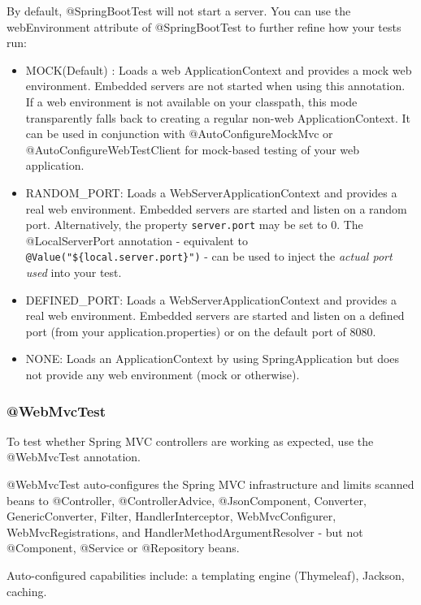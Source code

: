 \documentclass{scrartcl}
\begin{document}
By default, @SpringBootTest will not start a server. You can use the webEnvironment attribute of @SpringBootTest to further refine how your tests run:

\begin{itemize}
    \item MOCK(Default) : Loads a web ApplicationContext and provides a mock web environment. Embedded servers are not started when using this annotation. If a web environment is not available on your classpath, this mode transparently falls back to creating a regular non-web ApplicationContext. It can be used in conjunction with @AutoConfigureMockMvc or @AutoConfigureWebTestClient for mock-based testing of your web application.

    \item RANDOM\_PORT: Loads a WebServerApplicationContext and provides a real web environment. Embedded servers are started and listen on a random port.
    Alternatively, the property \lstinline|server.port| may be set to 0.
    The @LocalServerPort annotation - equivalent to  \lstinline|@Value("${local.server.port}")| - can be used to inject the \textit{actual port used} into your test.

    \item DEFINED\_PORT: Loads a WebServerApplicationContext and provides a real web environment. Embedded servers are started and listen on a defined port (from your application.properties) or on the default port of 8080.

    \item NONE: Loads an ApplicationContext by using SpringApplication but does not provide any web environment (mock or otherwise).
\end{itemize}

\subsubsection{@WebMvcTest}

To test whether Spring MVC controllers are working as expected, use the @WebMvcTest annotation.

@WebMvcTest auto-configures the Spring MVC infrastructure and limits scanned beans to @Controller, @ControllerAdvice, @JsonComponent, Converter, GenericConverter, Filter, HandlerInterceptor, WebMvcConfigurer, WebMvcRegistrations, and HandlerMethodArgumentResolver - but not @Component, @Service or @Repository beans.

Auto-configured capabilities include: a templating engine (Thymeleaf), Jackson, caching.
\end{document}
